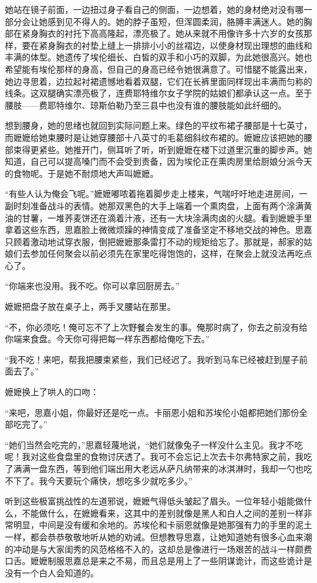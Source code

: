 \par 她站在镜子前面，一边扭过身子看自己的侧面，一边想着，她的身材绝对没有哪一部分会让她感到见不得人的。她的脖子虽短，但浑圆柔润，胳膊丰满迷人。她的胸部在紧身胸衣的衬托下高高隆起，漂亮极了。她从来就不用像许多十六岁的女孩那样，要在紧身胸衣的衬垫上缝上一排排小小的丝褶边，以使身材现出理想的曲线和丰满的体型。她遗传了埃伦细长、白皙的双手和小巧的双脚，为此她很高兴。她也希望能有埃伦那样的身高，但自己的身高已经令她很满意了。可惜腿不能露出来，她边寻思着，边拉起衬裙遗憾地看着双腿，它们在长裤里面同样现出丰满而匀称的线条。这双腿确实漂亮极了，连费耶特维尔女子学院的姑娘们都承认这一点。至于腰肢——费耶特维尔、琼斯伯勒乃至三县中也没有谁的腰肢能如此纤细的。
\par 想到腰身，她的思绪也就回到实际问题上来。绿色的平纹布裙子腰部是十七英寸，而嬷嬷给她束腰时是让她穿腰部十八英寸的毛葛细斜纹布裙的。嬷嬷应该把她的腰部束得更紧些。她推开门，侧耳听了听，听到嬷嬷在楼下过道里沉重的脚步声。她知道，自己可以提高嗓门而不会受到责备，因为埃伦正在熏肉房里给厨娘分派今天的食物呢。于是她不耐烦地大声叫嬷嬷。
\par “有些人认为俺会飞呢。”嬷嬷嘟哝着拖着脚步走上楼来，气喘吁吁地走进房间，一副时刻准备战斗的表情。她那双黑色的大手上端着一个熏肉盘，上面有两个涂满黄油的甘薯，一堆荞麦饼还在滴着汁液，还有一大块涂满肉卤的火腿。看到嬷嬷手里拿着这些东西，思嘉脸上微微烦躁的神情变成了准备坚定不移地交战的神色。思嘉只顾着激动地试穿衣服，倒把嬷嬷那条雷打不动的规矩给忘了。那就是，郝家的姑娘们去参加任何聚会以前必须先在家里吃得饱饱的，这样，在聚会上就没法再吃点心了。
\par “你端来也没用。我不吃。你可以拿回厨房去。”
\par 嬷嬷把盘子放在桌子上，两手叉腰站在那里。
\par “不，你必须吃！俺可忘不了上次野餐会发生的事。俺那时病了，你去之前没有给你端来食盘。今天你可得把每一样东西都给俺吃下去。”
\par “我不吃！来吧，帮我把腰束紧些，我们已经迟了。我听到马车已经被赶到屋子前面去了。”
\par 嬷嬷换上了哄人的口吻：
\par “来吧，思嘉小姐，你最好还是吃一点。卡丽恩小姐和苏埃伦小姐都把她们那份全部吃完了。”
\par “她们当然会吃完的，”思嘉轻蔑地说，“她们就像兔子一样没什么主见。我才不吃呢！我对这些食盘里的食物讨厌透了。我可不会忘记上次去卡尔弗特家之前，我吃了满满一盘东西，等到他们端出用大老远从萨凡纳带来的冰淇淋时，我却一勺也吃不下了。我今天要玩个痛快，想吃多少就吃多少。”
\par 听到这些极富挑战性的左道邪说，嬷嬷气得低头皱起了眉头。一位年轻小姐能做什么，不能做什么，在嬷嬷看来，这其中的差别就像是黑人和白人之间的差别一样非常明显，中间是没有缓和余地的。苏埃伦和卡丽恩就像是她那强有力的手里的泥土一样，都会恭恭敬敬地听从她的劝诫。但想教导思嘉，让她知道她有很多心血来潮的冲动是与大家闺秀的风范格格不入的，这却总是像进行一场艰苦的战斗一样颇费口舌。嬷嬷制服思嘉总是来之不易，而且总是用上了一些阴谋诡计，而这些诡计是没有一个白人会知道的。
